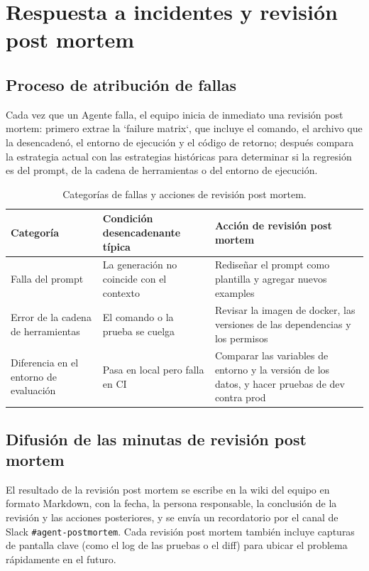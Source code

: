\section{Respuesta a incidentes y revisión post mortem}
\subsection{Proceso de atribución de fallas}
Cada vez que un Agente falla, el equipo inicia de inmediato una revisión post mortem: primero extrae la `failure matrix`, que incluye el comando, el archivo que la desencadenó, el entorno de ejecución y el código de retorno; después compara la estrategia actual con las estrategias históricas para determinar si la regresión es del prompt, de la cadena de herramientas o del entorno de ejecución.

\begin{table}[H]
\centering
\begin{tabular}{p{} p{} p{}}
\toprule
Categoría & Condición desencadenante típica & Acción de revisión post mortem \\
\midrule
Falla del prompt & La generación no coincide con el contexto & Rediseñar el prompt como plantilla y agregar nuevos examples \\
\midrule
Error de la cadena de herramientas & El comando o la prueba se cuelga & Revisar la imagen de docker, las versiones de las dependencias y los permisos \\
\midrule
Diferencia en el entorno de evaluación & Pasa en local pero falla en CI & Comparar las variables de entorno y la versión de los datos, y hacer pruebas de dev contra prod \\
\bottomrule
\end{tabular}
\caption{Categorías de fallas y acciones de revisión post mortem.}
\end{table}

\subsection{Difusión de las minutas de revisión post mortem}
El resultado de la revisión post mortem se escribe en la wiki del equipo en formato Markdown, con la fecha, la persona responsable, la conclusión de la revisión y las acciones posteriores, y se envía un recordatorio por el canal de Slack \texttt{\#agent-postmortem}. Cada revisión post mortem también incluye capturas de pantalla clave (como el log de las pruebas o el diff) para ubicar el problema rápidamente en el futuro.

